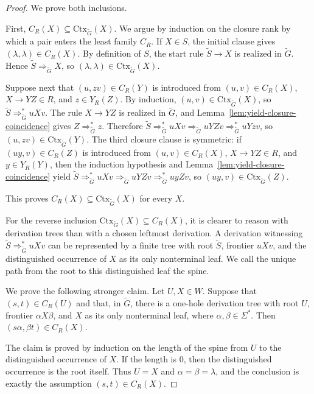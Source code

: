 \documentclass[sub]{jalc}
\newcommand{\Gtrim}{\widetilde G}
\begin{document}
\begin{proof}
We prove both inclusions.

First, \(C_R(X)\subseteq\mathrm{Ctx}_{\Gtrim}(X)\). We argue by induction on the closure rank by which a pair enters the least family \(C_R\). If \(X\in S\), the initial clause gives \((\lambda,\lambda)\in C_R(X)\). By definition of \(S\), the start rule \(\widetilde S\to X\) is realized in \(\Gtrim\). Hence \(\widetilde S\Rightarrow_{\Gtrim}X\), so \((\lambda,\lambda)\in\mathrm{Ctx}_{\Gtrim}(X)\).

Suppose next that \((u,zv)\in C_R(Y)\) is introduced from \((u,v)\in C_R(X)\), \(X\to YZ\in R\), and \(z\in Y_R(Z)\). By induction, \((u,v)\in\mathrm{Ctx}_{\Gtrim}(X)\), so \(\widetilde S\Rightarrow_{\Gtrim}^*uXv\). The rule \(X\to YZ\) is realized in \(\Gtrim\), and Lemma~\ref{lem:yield-closure-coincidence} gives \(Z\Rightarrow_{\Gtrim}^*z\). Therefore \(\widetilde S\Rightarrow_{\Gtrim}^*uXv\Rightarrow_{\Gtrim}uYZv\Rightarrow_{\Gtrim}^*uYzv\), so \((u,zv)\in\mathrm{Ctx}_{\Gtrim}(Y)\). The third closure clause is symmetric: if \((uy,v)\in C_R(Z)\) is introduced from \((u,v)\in C_R(X)\), \(X\to YZ\in R\), and \(y\in Y_R(Y)\), then the induction hypothesis and Lemma~\ref{lem:yield-closure-coincidence} yield \(\widetilde S\Rightarrow_{\Gtrim}^*uXv\Rightarrow_{\Gtrim}uYZv\Rightarrow_{\Gtrim}^*uyZv\), so \((uy,v)\in\mathrm{Ctx}_{\Gtrim}(Z)\).

This proves \(C_R(X)\subseteq\mathrm{Ctx}_{\Gtrim}(X)\) for every \(X\).

For the reverse inclusion \(\mathrm{Ctx}_{\Gtrim}(X)\subseteq C_R(X)\), it is clearer to reason with derivation trees than with a chosen leftmost derivation. A derivation witnessing \(\widetilde S\Rightarrow_{\Gtrim}^*uXv\) can be represented by a finite tree with root \(\widetilde S\), frontier \(uXv\), and the distinguished occurrence of \(X\) as its only nonterminal leaf. We call the unique path from the root to this distinguished leaf the spine.

We prove the following stronger claim. Let \(U,X\in W\). Suppose that \((s,t)\in C_R(U)\) and that, in \(\Gtrim\), there is a one-hole derivation tree with root \(U\), frontier \(\alpha X\beta\), and \(X\) as its only nonterminal leaf, where \(\alpha,\beta\in\Sigma^*\). Then \((s\alpha,\beta t)\in C_R(X)\).

The claim is proved by induction on the length of the spine from \(U\) to the distinguished occurrence of \(X\). If the length is \(0\), then the distinguished occurrence is the root itself. Thus \(U=X\) and \(\alpha=\beta=\lambda\), and the conclusion is exactly the assumption \((s,t)\in C_R(X)\).


\end{proof}
\end{document}
